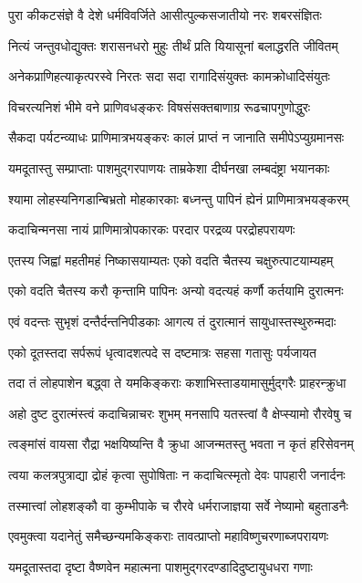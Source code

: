 \twolineshloka
{पुरा कीकटसंज्ञे वै देशे धर्मविवर्जिते}
{आसीत्पुल्कसजातीयो नरः शबरसंज्ञितः}%

\twolineshloka
{नित्यं जन्तुवधोद्युक्तः शरासनधरो मुहुः}
{तीर्थं प्रति यियासूनां बलाद्धरति जीवितम्}%

\twolineshloka
{अनेकप्राणिहत्याकृत्परस्वे निरतः सदा}
{सदा रागादिसंयुक्तः कामक्रोधादिसंयुतः}%

\twolineshloka
{विचरत्यनिशं भीमे वने प्राणिवधङ्करः}
{विषसंसक्तबाणाग्र रूढचापगुणोद्धुरः}%

\twolineshloka
{सैकदा पर्यटन्व्याधः प्राणिमात्रभयङ्करः}
{कालं प्राप्तं न जानाति समीपेऽप्युग्रमानसः}%

\twolineshloka
{यमदूतास्तु सम्प्राप्ताः पाशमुद्गरपाणयः}
{ताम्रकेशा दीर्घनखा लम्बदंष्ट्रा भयानकाः}%

\twolineshloka
{श्यामा लोहस्यनिगडान्बिभ्रतो मोहकारकाः}
{बध्नन्तु पापिनं ह्येनं प्राणिमात्रभयङ्करम्}%

\twolineshloka
{कदाचिन्मनसा नायं प्राणिमात्रोपकारकः}
{परदार परद्रव्य परद्रोहपरायणः}%

\twolineshloka
{एतस्य जिह्वां महतीमहं निष्कासयाम्यतः}
{एको वदति चैतस्य चक्षुरुत्पाटयाम्यहम्}%

\twolineshloka
{एको वदति चैतस्य करौ कृन्तामि पापिनः}
{अन्यो वदत्यहं कर्णौ कर्तयामि दुरात्मनः}%

\twolineshloka
{एवं वदन्तः सुभृशं दन्तैर्दन्तनिपीडकाः}
{आगत्य तं दुरात्मानं सायुधास्तस्थुरुन्मदाः}%

\twolineshloka
{एको दूतस्तदा सर्परूपं धृत्वादशत्पदे}
{स दष्टमात्रः सहसा गतासुः पर्यजायत}%

\twolineshloka
{तदा तं लोहपाशेन बद्ध्वा ते यमकिङ्कराः}
{कशाभिस्ताडयामासुर्मुद्गरैः प्राहरन्क्रुधा}%

\twolineshloka
{अहो दुष्ट दुरात्मंस्त्वं कदाचिन्नाचरः शुभम्}
{मनसापि यतस्त्वां वै क्षेप्स्यामो रौरवेषु च}%

\twolineshloka
{त्वङ्मांसं वायसा रौद्रा भक्षयिष्यन्ति वै क्रुधा}
{आजन्मतस्तु भवता न कृतं हरिसेवनम्}%

\twolineshloka
{त्वया कलत्रपुत्राद्या द्रोहं कृत्वा सुपोषिताः}
{न कदाचित्स्मृतो देवः पापहारी जनार्दनः}%

\twolineshloka
{तस्मात्त्वां लोहशङ्कौ वा कुम्भीपाके च रौरवे}
{धर्मराजाज्ञया सर्वे नेष्यामो बहुताडनैः}%

\twolineshloka
{एवमुक्त्वा यदानेतुं समैच्छन्यमकिङ्कराः}
{तावत्प्राप्तो महाविष्णुचरणाब्जपरायणः}%

\twolineshloka
{यमदूतास्तदा दृष्टा वैष्णवेन महात्मना}
{पाशमुद्गरदण्डादिदुष्टायुधधरा गणाः}%

